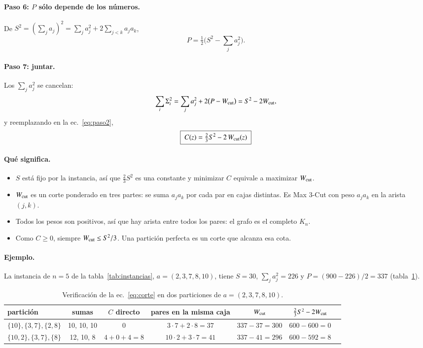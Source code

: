\documentclass[11pt,a4paper]{article}
\begin{document}
\paragraph{Paso 6: $P$ sólo depende de los números.} De $S^2=(\sum_ja_j)^2=\sum_ja_j^2+2\sum_{j<k}a_ja_k$,
\begin{equation}
  P=\tfrac12\Big(S^2-\sum_ja_j^2\Big).
\end{equation}

\paragraph{Paso 7: juntar.} Los $\sum_ja_j^2$ se cancelan:
\begin{equation}
  \sum_i\Sigma_i^2=\sum_ja_j^2+2\big(P-W_{\rm cut}\big)=S^2-2W_{\rm cut},
\end{equation}
y reemplazando en la ec.~\eqref{eq:paso2},
\begin{equation}
  \boxed{\;C(z)=\tfrac23S^2-2\,W_{\rm cut}(z)\;}
  \label{eq:corte}
\end{equation}

\paragraph{Qué significa.}
\begin{itemize}
\item $S$ está fijo por la instancia, así que $\tfrac23S^2$ es una constante y minimizar $C$
  equivale a maximizar $W_{\rm cut}$.
\item $W_{\rm cut}$ es un corte ponderado en tres partes: se suma $a_ja_k$ por cada par en cajas
  distintas. Es Max 3-Cut con peso $a_ja_k$ en la arista $(j,k)$.
\item Todos los pesos son positivos, así que hay arista entre todos los pares: el grafo es el
  completo $K_n$.
\item Como $C\geq0$, siempre $W_{\rm cut}\leq S^2/3$. Una partición perfecta es un corte que alcanza
  esa cota.
\end{itemize}

\paragraph{Ejemplo.} La instancia de $n=5$ de la tabla~\ref{tab:instancias}, $a=(2,3,7,8,10)$, tiene
$S=30$, $\sum_ja_j^2=226$ y $P=(900-226)/2=337$ (tabla~\ref{tab:ejemplo}).

\begin{table}[h]
\centering
\caption{Verificación de la ec.~\eqref{eq:corte} en dos particiones de $a=(2,3,7,8,10)$.}
\label{tab:ejemplo}
\small
\begin{tabular}{lcccccc}
\toprule
partición & sumas & $C$ directo & pares en la misma caja & $W_{\rm cut}$ & $\tfrac23S^2-2W_{\rm cut}$ \\
\midrule
$\{10\},\{3,7\},\{2,8\}$ & 10, 10, 10 & 0 & $3\cdot7+2\cdot8=37$ & $337-37=300$ & $600-600=0$ \\
$\{10,2\},\{3,7\},\{8\}$ & 12, 10, 8 & $4+0+4=8$ & $10\cdot2+3\cdot7=41$ & $337-41=296$ & $600-592=8$ \\
\bottomrule
\end{tabular}
\end{table}
\end{document}
